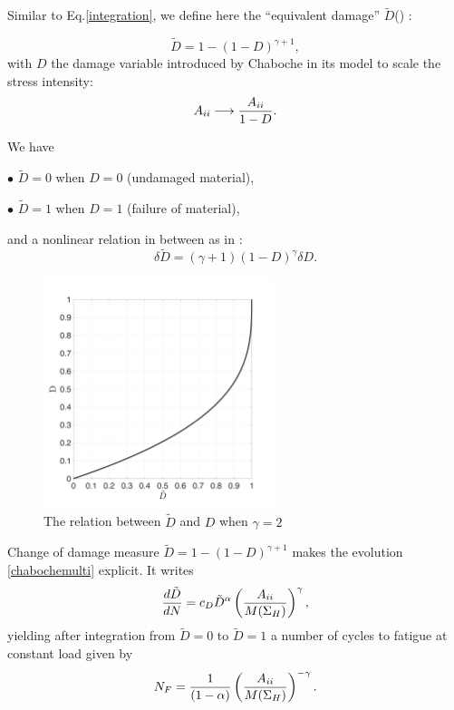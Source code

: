 Similar to Eq.\eqref{integration}, we define here the ``equivalent damage'' $\tilde{D}$() :

\begin{equation}
\tilde{D}=1-(1-D)^{\gamma+1},
\label{eq.Dhat}
\end{equation}
with $D$ the damage variable introduced by Chaboche in its model to scale the stress intensity:
$${A}_{\uppercase\expandafter{\romannumeral2}} \longrightarrow \dfrac{{A}_{\uppercase\expandafter{\romannumeral2}}}{1-D}.$$

We have 

$\bullet$ $\tilde{D}=0$ when $D=0$ (undamaged material),

$\bullet$ $\tilde{D}=1$ when $D=1$ (failure of material),	

and a nonlinear relation in between as in :
$$\delta\tilde{D}=\left(\gamma+1 \right)\left( 1-D\right)^\gamma \delta D.$$	
\begin{figure}
\centering
\includegraphics[width=0.6\textwidth]{figures//Dhat.png} 
\caption{The relation between $\tilde{D}$ and $D$ when $\gamma=2$}
\label{fig.Dhat}
\end{figure}

Change of damage measure $\tilde{D} = 1 - (1-D)^{\gamma+1}$ makes the evolution \eqref{chabochemulti} explicit. It writes
\begin{equation}
\dfrac{d\tilde{D}}{dN} = c_D {\tilde{D}}^\alpha \left(\dfrac{{A}_{\uppercase\expandafter{\romannumeral2}}}{M(\Sigma_{H})} \right) ^\gamma,
\label{eq.diffchaboche}
\end{equation}
yielding after integration from $\tilde{D}=0$ to $\tilde{D}=1$  a number of cycles to fatigue at constant load given by
$$
N_F =\dfrac{1}{(1-\alpha)}\left(\dfrac{{A}_{\uppercase\expandafter{\romannumeral2}}}{M(\Sigma_{H})} \right) ^{-\gamma}.
$$

